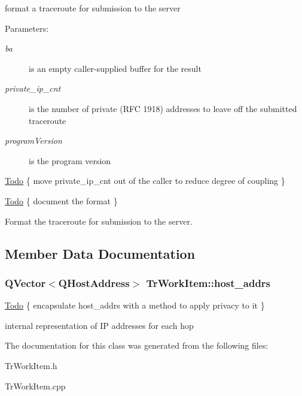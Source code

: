 format a traceroute for submission to the server \begin{Desc}
\item[Parameters:]
\begin{description}
\item[{\em ba}]is an empty caller-supplied buffer for the result \item[{\em private\_\-ip\_\-cnt}]is the number of private (RFC 1918) addresses to leave off the submitted traceroute \item[{\em programVersion}]is the program version \end{description}
\end{Desc}
\begin{Desc}
\item[\hyperlink{todo__todo000006}{Todo}]\{ move private\_\-ip\_\-cnt out of the caller to reduce degree of coupling \} \end{Desc}
\begin{Desc}
\item[\hyperlink{todo__todo000006}{Todo}]\{ document the format \} \end{Desc}
Format the traceroute for submission to the server. 

\subsection{Member Data Documentation}
\hypertarget{classTrWorkItem_bec5a48d1d5cf74bb01453ab708e4aeb}{
\subsubsection[host\_\-addrs]{\setlength{\rightskip}{0pt plus 5cm}QVector$<$QHostAddress$>$ {\bf TrWorkItem::host\_\-addrs}}}
\label{classTrWorkItem_bec5a48d1d5cf74bb01453ab708e4aeb}


\begin{Desc}
\item[\hyperlink{todo__todo000008}{Todo}]\{ encapsulate host\_\-addrs with a method to apply privacy to it \} \end{Desc}
internal representation of IP addresses for each hop 

The documentation for this class was generated from the following files:\begin{CompactItemize}
\item 
TrWorkItem.h\item 
TrWorkItem.cpp\end{CompactItemize}
